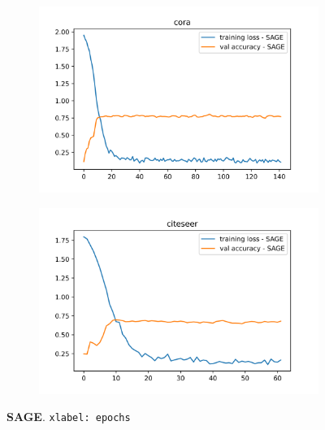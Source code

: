 \documentclass[11pt]{article}
\begin{document}
    \begin{figure}[H]
        \centering
        \begin{subfigure}{0.5\linewidth}
            \includegraphics[width=1\linewidth]{SAGE_cora_best.png}
        \end{subfigure}%
        \begin{subfigure}{0.5\linewidth}
            \includegraphics[width=1\linewidth]{SAGE_citeseer_best.png}
        \end{subfigure}
        \caption{\textbf{SAGE}. \texttt{xlabel: epochs}}
    \end{figure}
\vspace{-0.8cm}
\end{document}
